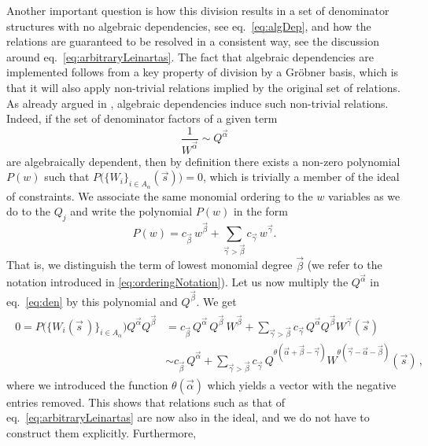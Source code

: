 Another important question is how this division results in a set of denominator
structures with no algebraic dependencies, see eq.~\eqref{eq:algDep}, and 
how the relations are guaranteed to be resolved in a consistent way,
see the discussion around eq.~\eqref{eq:arbitraryLeinartas}.
The fact that algebraic dependencies are implemented follows from a key property of
division by a Gröbner basis, which is that it will also apply non-trivial
relations implied by the original set of relations. As already argued in
\cite{raichev2012leinartas}, algebraic dependencies induce such non-trivial
relations. Indeed, if the set of denominator factors of a given term 
\begin{equation}
\label{eq:den}
\frac{1}{W^{\vec \alpha}} \sim Q^{\vec\alpha} 
\end{equation}
are algebraically dependent, then by
definition there exists a non-zero polynomial $P(w)$ such that
$P\big(\{ W_i\}_{i\in A_\alpha}(\vec s)\big) = 0$, which
is trivially a member of the ideal of constraints. 
We associate the same monomial ordering to the $w$ variables as we do to
the $Q_j$ and write the polynomial $P(w)$ in the form
\begin{equation}
    P(w) = c_{\vec\beta}\, w^{\vec\beta} + 
	\sum_{\vec\gamma > \vec\beta} c_{\vec\gamma}\, w^{\vec\gamma}.
\end{equation}
That is, we distinguish the term of lowest monomial degree $\vec\beta$ 
(we refer to the notation introduced in \cref{eq:orderingNotation}). 
Let us now multiply the $Q^{\vec\alpha}$ in eq.~\eqref{eq:den} by this polynomial and 
$Q^{\vec\beta}$. We get
\begin{align}\begin{split}
    0=P\big(\{ W_i(\vec{s}\,)\}_{i\in A_\alpha}\big) Q^{\vec \alpha} Q^{\vec \beta}&= c_{\vec\beta}\,Q^{\vec\alpha} \,Q^{\vec\beta} \,W^{\vec\beta}    + 
  \sum_{\vec\gamma > \vec\beta} c_{\vec\gamma} \,
  Q^{\vec\alpha} Q^{\vec\beta}
  W^{\vec\gamma}(\vec s) \\
    &\sim  c_{\vec\beta}\,Q^{\vec\alpha}     + 
  \sum_{\vec\gamma > \vec\beta} c_{\vec\gamma} \,
    Q^{\theta(\vec\alpha + \vec\beta - \vec\gamma)} 
    W^{\theta(\vec\gamma - \vec\alpha - \vec\beta)}(\vec s)\,,
\end{split}\end{align}
where we introduced the function
$\theta(\vec\alpha)$ which yields a vector with the
negative entries removed. This shows that relations such 
as that of eq.~\eqref{eq:arbitraryLeinartas} are now also in the ideal, 
and we do not have to construct them explicitly. Furthermore,
